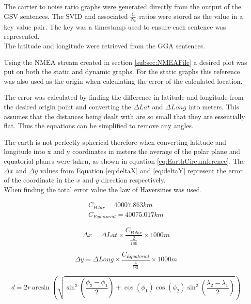 The carrier to noise ratio graphs were generated directly from the output of the GSV sentences. The SVID and associated $\frac{C}{N_0}$ ratios were stored as the value in
a key value pair. The key was a timestamp used to ensure each sentence was represented.\\
The latitude and longitude were retrieved from the GGA sentences.

Using the NMEA stream created in section \ref{subsec:NMEAFile} a desired plot was put on both the static and dynamic graphs. For the static graphs this reference was also
used as the origin when calculating the error of the calculated location.

The error was calculated by finding the difference in latitude and longitude from the desired origin point and converting the $\Delta Lat$ and $\Delta Long$ into meters.
This assumes that the distances being dealt with are so small that they are essentially flat. Thus the equations can be simplified to remove any angles.

The earth is not perfectly spherical therefore when converting latitude and longitude into x and y coordinates in meters the average of the polar plane and equatorial
planes were taken, as shown in equation \ref{eq:EarthCircumference}. The $\Delta x$ and $\Delta y$ values from Equation \ref{eq:deltaX} and \ref{eq:deltaY} represent
the error of the coordinate in the $x$ and $y$ direction respectively. \\
When finding the total error value the law of Haversines was used. 

\begin{equation} 
    \begin{split} \label{eq:EarthCircumference}
        C_{Polar} = 40007.863 km \\ 
        C_{Equatorial} = 40075.017 km
    \end{split}
\end{equation}

\begin{equation} \label{eq:deltaX}
    \Delta x = \Delta Lat \times \frac{C_{Polar}}{\frac{2}{180}} \times 1000 m
\end{equation}

\begin{equation} \label{eq:deltaY}
    \Delta y = \Delta Long \times \frac{C_{Equatorial}}{\frac{4}{90}} \times 1000 m
\end{equation}

\begin{equation} \label{eq:Haversine}
    d = 2r \arcsin\left(\sqrt{\sin^2\left(\frac{\phi_2 - \phi_1}{2}\right) + \cos\left(\phi_1\right)\cos\left(\phi_2\right)\sin^2\left(\frac{\lambda_2 - \lambda_1}{2}\right)}\right)
\end{equation}
 
